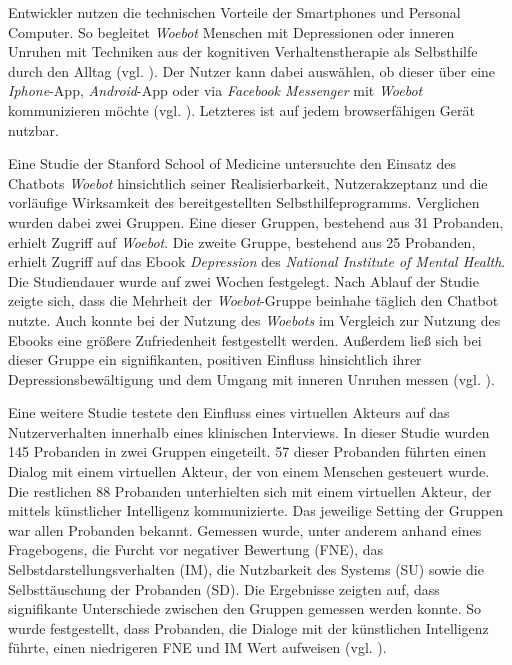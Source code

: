 Entwickler nutzen die technischen Vorteile der Smartphones und Personal Computer. So begleitet \emph{Woebot} Menschen mit Depressionen oder inneren Unruhen mit Techniken aus der kognitiven Verhaltenstherapie als Selbsthilfe durch den Alltag (vgl. \cite{Fitzpatrick2017}). Der Nutzer kann dabei auswählen, ob dieser über eine \emph{Iphone}-App, \emph{Android}-App oder via \emph{Facebook Messenger} mit \emph{Woebot} kommunizieren möchte (vgl. \cite{WoebotYo93:online}). Letzteres ist auf jedem browserfähigen Gerät nutzbar. 


Eine Studie der Stanford School of Medicine untersuchte den Einsatz des Chatbots \emph{Woebot} hinsichtlich seiner Realisierbarkeit, Nutzerakzeptanz und die vorläufige Wirksamkeit des bereitgestellten Selbsthilfeprogramms. Verglichen wurden dabei zwei Gruppen. Eine dieser Gruppen, bestehend aus 31 Probanden, erhielt Zugriff auf \emph{Woebot}. Die zweite Gruppe, bestehend aus 25 Probanden, erhielt Zugriff auf das Ebook \emph{Depression} des \emph{National Institute of Mental Health}. Die Studiendauer wurde auf zwei Wochen festgelegt. Nach Ablauf der Studie zeigte sich, dass die Mehrheit der \emph{Woebot}-Gruppe beinhahe täglich den Chatbot nutzte. Auch konnte bei der Nutzung des \emph{Woebots} im Vergleich zur Nutzung des Ebooks eine größere Zufriedenheit festgestellt werden. Außerdem ließ sich bei dieser Gruppe ein signifikanten, positiven Einfluss hinsichtlich ihrer Depressionsbewältigung und dem Umgang mit inneren Unruhen messen (vgl. \cite{Fitzpatrick2017}).

Eine weitere Studie testete den Einfluss eines virtuellen Akteurs auf das Nutzerverhalten innerhalb eines klinischen Interviews. In dieser Studie wurden 145 Probanden in zwei Gruppen eingeteilt. 57 dieser Probanden führten einen Dialog mit einem virtuellen Akteur, der von einem Menschen gesteuert wurde. Die restlichen 88 Probanden unterhielten sich mit einem virtuellen Akteur, der mittels künstlicher Intelligenz kommunizierte. Das jeweilige Setting der Gruppen war allen Probanden bekannt. Gemessen wurde, unter anderem anhand eines Fragebogens, die Furcht vor negativer Bewertung (FNE), das Selbstdarstellungsverhalten (IM), die Nutzbarkeit des Systems (SU) sowie die Selbsttäuschung der Probanden (SD). Die Ergebnisse zeigten auf, dass signifikante Unterschiede zwischen den Gruppen gemessen werden konnte. So wurde festgestellt, dass Probanden, die Dialoge mit der künstlichen Intelligenz führte, einen niedrigeren FNE und IM Wert aufweisen (vgl. \cite{Gratch2014}). 


